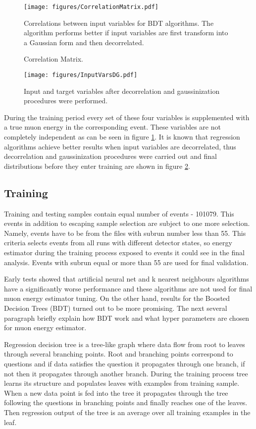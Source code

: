 \begin{figure}[!th]
\centering
\texttt{[image: figures/CorrelationMatrix.pdf]}
\caption{Correlation Matrix.}
{Correlations between input variables for BDT algorithms. The algorithm performs better if input
variables are first transform into a Gaussian form and then decorrelated. }
\label{fig:corrMatrix}
\end{figure}

\begin{figure}[!th]
\centering
\texttt{[image: figures/InputVarsDG.pdf]}
\caption{Input and target variables after decorrelation and gaussinization procedures were performed.}
\label{fig:inputDG}
\end{figure}
During the training period every set of these four variables is supplemented with a true muon
energy in the corresponding event. These variables are not completely independent as 
can be seen in figure \ref{fig:corrMatrix}. It is known that regression algorithms achieve 
better results when input variables are decorrelated, thus decorrelation and gaussinization
procedures were carried out and final distributions before they enter training are shown in figure
\ref{fig:inputDG}.

\subsection{Training}
Training and testing samples contain equal number of events - 101079. This events in addition
to escaping sample selection are subject to one more selection. Namely, events have to be
from the files with subrun number less than 55. This criteria selects events from all
runs with different detector states, so energy estimator during the training process exposed
to events it could see in the final analysis. Events with subrun equal or more than 55 are used 
for final validation. 

Early tests showed that artificial neural net and k nearest neighbours algorithms have a 
significantly worse performance and these algorithms are not used for final muon energy 
estimator tuning. On the other hand, results for the Boosted Decision Trees (BDT) turned out
to be more promising. The next several paragraph briefly explain how BDT work and what 
hyper parameters are chosen for muon energy estimator.

Regression decision tree is a tree-like graph where data flow from root to leaves through 
several branching points. Root and branching points correspond to questions and if data 
satisfies the question it propagates through one branch, if not then it propagates through
another branch. During the training process tree learns its structure and populates leaves 
with examples from training sample. When a new data point is fed into the tree it propagates
through the tree following the questions in branching points and finally reaches one of the leaves. 
Then regression output of the tree is an average over all training examples in the leaf. 

